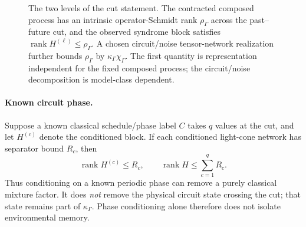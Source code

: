 \documentclass[11pt]{article}
\newcommand{\rank}{\operatorname{rank}}
\begin{document}
\begin{figure}[t]
\centering
{}
\caption{The two levels of the cut statement. The contracted composed process has an intrinsic operator-Schmidt rank $\rho_\Gamma$ across the past--future cut, and the observed syndrome block satisfies $\rank H^{(\ell)}\le\rho_\Gamma$. A chosen circuit/noise tensor-network realization further bounds $\rho_\Gamma$ by $\kappa_\Gamma\chi_\Gamma$. The first quantity is representation independent for the fixed composed process; the circuit/noise decomposition is model-class dependent.}
\label{fig:causalcut}
\end{figure}

\paragraph{Known circuit phase.}
Suppose a known classical schedule/phase label $C$ takes $q$ values at the cut, and let $H^{(c)}$ denote the conditioned block. If each conditioned light-cone network has separator bound $R_c$, then
\begin{equation}
    \rank H^{(c)}\le R_c,
    \qquad
    \rank H\le\sum_{c=1}^q R_c.
    \label{eq:phasepool}
\end{equation}
Thus conditioning on a known periodic phase can remove a purely classical mixture factor. It does \emph{not} remove the physical circuit state crossing the cut; that state remains part of $\kappa_\Gamma$. Phase conditioning alone therefore does not isolate environmental memory.
\end{document}
